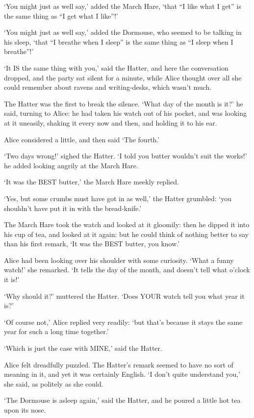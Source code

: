 \documentclass[12pt]{book}
\begin{document}
  `You might just as well say,' added the March Hare, `that ``I
like what I get'' is the same thing as ``I get what I like''!'

  `You might just as well say,' added the Dormouse, who seemed to
be talking in his sleep, `that ``I breathe when I sleep'' is the
same thing as ``I sleep when I breathe''!'

  `It IS the same thing with you,' said the Hatter, and here the
conversation dropped, and the party sat silent for a minute,
while Alice thought over all she could remember about ravens and
writing-desks, which wasn't much.

  The Hatter was the first to break the silence.  `What day of
the month is it?' he said, turning to Alice:  he had taken his
watch out of his pocket, and was looking at it uneasily, shaking
it every now and then, and holding it to his ear.

  Alice considered a little, and then said `The fourth.'

  `Two days wrong!' sighed the Hatter.  `I told you butter
wouldn't suit the works!' he added looking angrily at the March
Hare.

  `It was the BEST butter,' the March Hare meekly replied.

  `Yes, but some crumbs must have got in as well,' the Hatter
grumbled:  `you shouldn't have put it in with the bread-knife.'

  The March Hare took the watch and looked at it gloomily:  then
he dipped it into his cup of tea, and looked at it again:  but he
could think of nothing better to say than his first remark, `It
was the BEST butter, you know.'

  Alice had been looking over his shoulder with some curiosity.
`What a funny watch!' she remarked.  `It tells the day of the
month, and doesn't tell what o'clock it is!'

  `Why should it?' muttered the Hatter.  `Does YOUR watch tell
you what year it is?'

  `Of course not,' Alice replied very readily:  `but that's
because it stays the same year for such a long time together.'

  `Which is just the case with MINE,' said the Hatter.

  Alice felt dreadfully puzzled.  The Hatter's remark seemed to
have no sort of meaning in it, and yet it was certainly English.
`I don't quite understand you,' she said, as politely as she
could.

  `The Dormouse is asleep again,' said the Hatter, and he poured
a little hot tea upon its nose.
\end{document}
